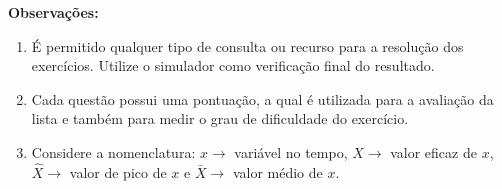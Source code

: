 \documentclass[11pt]{utfpr-exam}
\begin{document}
\imprimircabecalholista


\imprimirtabelacombinada
		
	
	
\begin{framed}
	\noindent \textbf{Observações:}
	\begin{enumerate}
		\item É permitido qualquer tipo de consulta ou recurso para a resolução dos exercícios. Utilize o simulador como verificação final do resultado. 
		\item Cada questão possui uma pontuação, a qual é utilizada para a avaliação da lista e também para medir o grau de dificuldade do exercício.
		\item Considere a nomenclatura: $x \rightarrow$ variável no tempo, $X \rightarrow$ valor eficaz de $x$, $\hat{X} \rightarrow$ valor de pico de $x$ e $\bar{X} \rightarrow$ valor médio de $x$.
	\end{enumerate}
\end{framed}	
\end{document}
